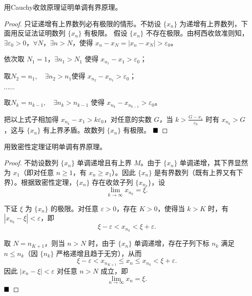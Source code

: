 \begin{problem}
    用Cauchy收敛原理证明单调有界原理。
\end{problem}

\begin{proof}
    只证递增有上界数列必有极限的情形。不妨设 $\{x_n\}$ 为递增有上界数列，下面用反证法证明数列 $\{x_n\}$ 有极限。
    假设 $\{x_n\}$ 不存在极限。由柯西收敛准则知，$\exists \varepsilon_0 > 0$，$\forall N$，$\exists n > N$，使得 $x_n - x_N = |x_n - x_N| > \varepsilon_0$。
    
    依次取 $N_1 = 1$，$\exists n_1 > N_1$ 使得 $x_{n_1} - x_1 > \varepsilon_0$；
    
    取$N_2 = n_1, \quad \exists n_2 > n_1$使得 $x_{n_2} - x_{n_1} > \varepsilon_0$；
    
    $\cdots \cdots$

    取$
    N_k = n_{k-1}, \quad \exists n_k > n_{k-1}
    $
    使得 $x_{n_k} - x_{n_{k-1}} > \varepsilon_0$。
    
 

    把以上式子相加得 $x_{n_k} - x_1 > k \varepsilon_0$，对任意的实数 $G$，当 $k > \frac{G - x_1}{\varepsilon_0}$ 时有 $x_{n_k} > G$，这与 $\{x_n\}$ 有上界矛盾。故数列 $\{x_n\}$ 有极限。 $\hfill\blacksquare$
\end{proof}

\begin{problem}
    用致密性定理证明单调有界原理。
\end{problem}

\begin{proof}
    不妨设数列 $\{x_n\}$ 单调递增且有上界 $M$。由于 $\{x_n\}$ 单调递增，其下界显然为 $x_1$（即对任意 $n \geq 1$，有 $x_n \geq x_1$）。因此 $\{x_n\}$ 是有界数列（既有上界又有下界）。根据致密性定理，$\{x_n\}$ 存在收敛子列 $\{x_{n_k}\}$，设
    $$
    \lim\limits_{k \to \infty} x_{n_k} = \xi.
    $$
    
    下证 $\xi$ 为 $\{x_n\}$ 的极限。对任意 $\varepsilon > 0$，存在 $K > 0$，使得当 $k > K$ 时，有 $|x_{n_k} - \xi| < \varepsilon$，即
    $$
    \xi - \varepsilon < x_{n_k} < \xi + \varepsilon.
    $$
    
    取 $N = n_{K+1}$，则当 $n > N$ 时，由于 $\{x_n\}$ 单调递增，存在子列下标 $n_k$ 满足 $n \leq n_k$（因 $\{n_k\}$ 严格递增且趋于无穷），从而
    $$
    \xi - \varepsilon < x_{n_{K+1}} \leq x_n \leq x_{n_k} < \xi + \varepsilon.
    $$
    因此 $|x_n - \xi| < \varepsilon$ 对任意 $n > N$ 成立，即
    $$
    \lim\limits_{n \to \infty} x_n = \xi.
    $$        $\hfill\blacksquare$
  
\end{proof}

